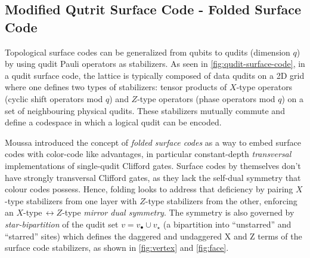 \subsection{Modified Qutrit Surface Code - Folded Surface Code}\label{sec: qudit surface code}

Topological surface codes can be generalized from qubits to qudits (dimension $q$) by using qudit Pauli operators as stabilizers. As seen in \autoref{fig:qudit-surface-code}, in a qudit surface code, the lattice is typically composed of data qudits on a 2D grid where one defines two types of stabilizers: tensor products of $X$-type operators (cyclic shift operators mod $q$) and $Z$-type operators (phase operators mod $q$) on a set of neighbouring physical qudits. These stabilizers mutually commute and define a codespace in which a logical qudit can be encoded. 


Moussa \cite{Moussa2016} introduced the concept of \emph{folded surface codes} as a way to embed surface codes with color-code like advantages, in particular constant-depth \emph{transversal} implementations of single-qudit Clifford gates. Surface codes by themselves don't have strongly transversal Clifford gates, as they lack the self-dual symmetry that colour codes possess. Hence, folding looks to address that deficiency by pairing $X$-type stabilizers from one layer with $Z$-type stabilizers from the other, enforcing an
$X$-type$ \,\leftrightarrow\! Z$-type \emph{mirror dual symmetry}. The symmetry is also governed by \emph{star-bipartition} of the qudit set $v=v_\bullet\cup v_\star$ (a bipartition into “unstarred” and
“starred” sites) which defines the daggered and undaggered X and Z terms of the surface code stabilizers, as shown in \autoref{fig:vertex} and \autoref{fig:face}. 

